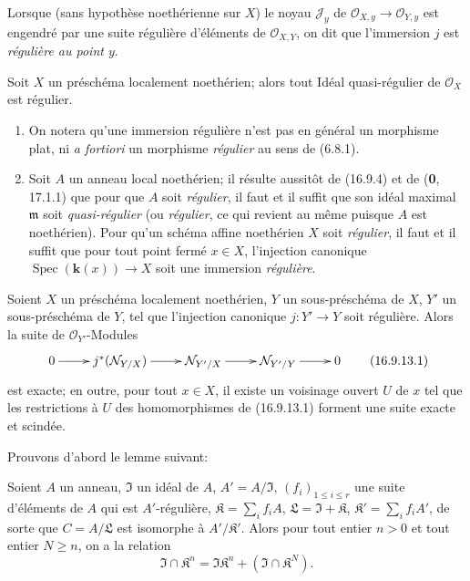 Lorsque (sans hypothèse noethérienne sur $X$) le noyau $\mathscr{J}_y$ de
$\mathcal{O}_{X,y}\to\mathcal{O}_{Y,y}$ est engendré par une suite régulière
d'éléments de $\mathcal{O}_{X,Y}$, on dit que l'immersion $j$ est
\emph{régulière au point $y$}.

\begin{corollary}[16.9.11]
\label{IV.16.9.11}
Soit $X$ un préschéma localement noethérien; alors tout Idéal quasi-régulier de
$\mathcal{O}_X$ est régulier.
\end{corollary}

\begin{remarks}[16.9.12]
\label{IV.16.9.12}
\begin{enumerate}
  \item[(i)] On notera qu'une immersion régulière n'est pas en général un
  morphisme plat, ni \emph{a fortiori} un morphisme \emph{régulier} au sens de
  (6.8.1).
  \item[(ii)] Soit $A$ un anneau local noethérien; il résulte aussitôt de
  (16.9.4) et de (\textbf{0}, 17.1.1) que pour que $A$ soit \emph{régulier}, il faut et
  il suffit que son idéal maximal $\mathfrak{m}$ soit \emph{quasi-régulier}
  (ou \emph{régulier}, ce qui revient au même puisque $A$ est noethérien).
  Pour qu'un schéma affine noethérien $X$ soit \emph{régulier}, il faut et il
  suffit que pour tout point fermé $x\in X$, l'injection canonique
  $\operatorname{Spec}(\boldsymbol{k}(x))\to X$ soit une immersion \emph{régulière}.
\end{enumerate}
\end{remarks}

\begin{proposition}[16.9.13]
\label{IV.16.9.13}
Soient $X$ un préschéma localement noethérien, $Y$ un sous-préschéma de $X$,
$Y'$ un sous-préschéma de $Y$, tel que l'injection canonique $j:Y'\to Y$ soit
régulière. Alors la suite de $\mathcal{O}_{Y'}$-Modules
\[
  \xymatrix{
    0\ar[r] & j^*(\mathcal{N}_{Y/X})\ar[r]
      & \mathcal{N}_{Y'/X}\ar[r] & \mathcal{N}_{Y'/Y}\ar[r] & 0
  }
  \tag{16.9.13.1}
  \label{IV.16.9.13.1}
\]
est exacte; en outre, pour tout $x\in X$, il existe un voisinage ouvert $U$
de $x$ tel que les restrictions à $U$ des homomorphismes de (16.9.13.1)
forment une suite exacte et scindée.
\end{proposition}

Prouvons d'abord le lemme suivant:

\begin{lemma}[16.9.13.2]
\label{IV.16.9.13.2}
Soient $A$ un anneau, $\mathfrak{I}$ un idéal de $A$,
$A'=A/\mathfrak{I}$, $(f_i)_{1\leq i\leq r}$ une suite d'éléments de $A$ qui
est $A'$-régulière, $\mathfrak{K}=\sum_i f_iA$,
$\mathfrak{L}=\mathfrak{I}+\mathfrak{K}$,
$\mathfrak{K}'=\sum_i f_iA'$, de sorte que $C=A/\mathfrak{L}$ est isomorphe à
$A'/\mathfrak{K}'$. Alors pour tout entier $n>0$ et tout entier $N\geq n$,
on a la relation
\[
  \mathfrak{I}\cap\mathfrak{K}^n
  =\mathfrak{I}\mathfrak{K}^n+(\mathfrak{I}\cap\mathfrak{K}^N).
  \tag{16.9.13.3}
  \label{IV.16.9.13.3}
\]
\end{lemma}

